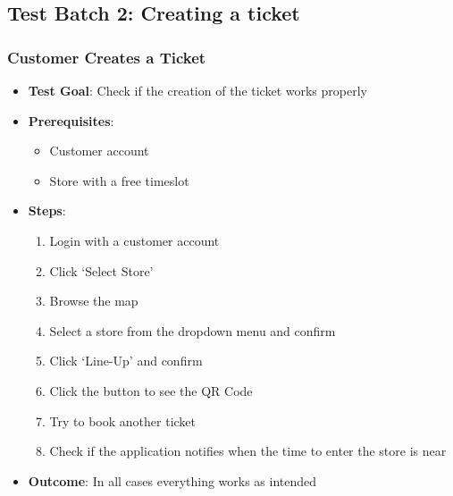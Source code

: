 \subsection{Test Batch 2: Creating a ticket}
\subsubsection{Customer Creates a Ticket}
\begin{itemize}
    \item \textbf{Test Goal}: Check if the creation of the ticket works properly
    \item \textbf{Prerequisites}:
        \begin{itemize}
            \item Customer account
            \item Store with a free timeslot
        \end{itemize}
    \item \textbf{Steps}:
        \begin{enumerate}
            \item Login with a customer account
            \item Click `Select Store'
            \item Browse the map
            \item Select a store from the dropdown menu and confirm
            \item Click `Line-Up' and confirm
            \item Click the button to see the QR Code
            \item Try to book another ticket
            \item Check if the application notifies when the time to enter the store is near 
        \end{enumerate}
    \item \textbf{Outcome}: In all cases everything works as intended
\end{itemize}
